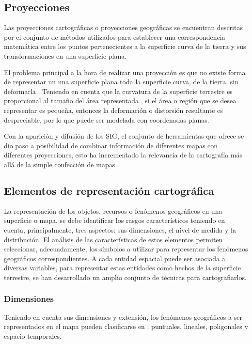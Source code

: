 \subsection{Proyecciones}
Las proyecciones cartográficas o proyecciones geográficas se encuentran descritas por el conjunto
de métodos utilizados para establecer una correspondencia matemática entre los puntos pertenecientes a la superficie curva de la tierra y sus transformaciones en una superficie plana.

El problema principal a la hora de realizar una proyección es que no existe forma de representar
un una superficie plana toda la superficie curva, de la tierra, sin deformarla
\citep{llopis2006sistemas}. Teniendo en cuenta que la curvatura de la superficie terrestre es
proporcional al tamaño del área representada \citep{llopis2006sistemas}, si el área o región que se
desea representar es pequeña, entonces la deformación o distorsión resultante es despreciable, por
lo que puede ser modelada con coordenadas planas.

Con la aparición y difusión de los SIG, el conjunto de herramientas que ofrece se dio paso a
posibilidad de combinar información de diferentes mapas con diferentes proyecciones, esto ha
incrementado la relevancia de la cartografía más allá de la simple confección de mapas
\citep{llopis2006sistemas}.

\subsection{Elementos de representación cartográfica}
La representación de los objetos, recursos o fenómenos geográficos en una superficie o mapa, se
debe identificar los rasgos característicos teniendo en cuenta, principalmente, tres aspectos:
sus dimensiones, el nivel de medida y la distribución. El análisis de las características de estos
elementos permiten seleccionar, adecuadamente, los símbolos a utilizar para representar los
fenómenos geográficos correspondientes. A cada entidad espacial puede ser asociada a diversas
variables, para representar estas entidades como hechos de la superficie terrestre, se han
desarrollado un amplio conjunto de técnicas para cartografiarlos.

\subsubsection{Dimensiones}
Teniendo en cuenta sus dimensiones y extensión, los fenómenos geográficos a ser representados en el
mapa pueden clasificarse en : puntuales, lineales, poligonales y espacio temporales.

